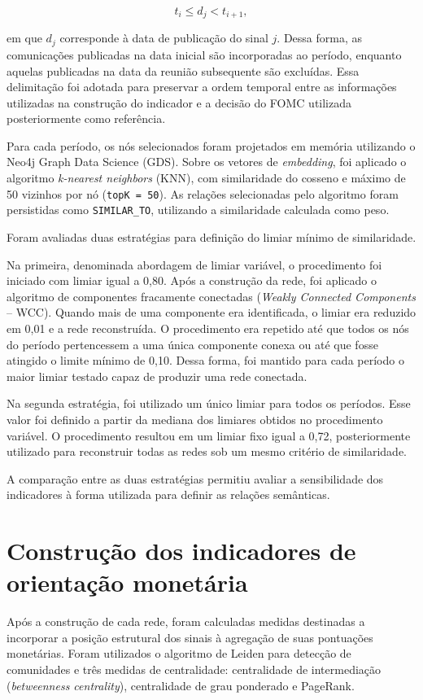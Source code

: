 \[
t_i \leq d_j < t_{i+1},
\]

em que $d_j$ corresponde à data de publicação do sinal $j$. Dessa forma, as
comunicações publicadas na data inicial são incorporadas ao período, enquanto
aquelas publicadas na data da reunião subsequente são excluídas. Essa
delimitação foi adotada para preservar a ordem temporal entre as informações
utilizadas na construção do indicador e a decisão do FOMC utilizada
posteriormente como referência.

Para cada período, os nós selecionados foram projetados em memória utilizando o
Neo4j Graph Data Science (GDS). Sobre os vetores de \textit{embedding}, foi
aplicado o algoritmo \textit{k-nearest neighbors} (KNN), com similaridade do
cosseno e máximo de 50 vizinhos por nó (\texttt{topK = 50}). As relações
selecionadas pelo algoritmo foram persistidas como
\texttt{SIMILAR\_TO}, utilizando a similaridade calculada como peso.

Foram avaliadas duas estratégias para definição do limiar mínimo de
similaridade.

Na primeira, denominada abordagem de limiar variável, o procedimento foi
iniciado com limiar igual a 0,80. Após a construção da rede, foi aplicado o
algoritmo de componentes fracamente conectadas (\textit{Weakly Connected
Components} -- WCC). Quando mais de uma componente era identificada, o limiar
era reduzido em 0,01 e a rede reconstruída. O procedimento era repetido até que
todos os nós do período pertencessem a uma única componente conexa ou até que
fosse atingido o limite mínimo de 0,10. Dessa forma, foi mantido para cada
período o maior limiar testado capaz de produzir uma rede conectada.

Na segunda estratégia, foi utilizado um único limiar para todos os períodos.
Esse valor foi definido a partir da mediana dos limiares obtidos no procedimento
variável. O procedimento resultou em um limiar fixo igual a 0,72, posteriormente
utilizado para reconstruir todas as redes sob um mesmo critério de similaridade.

A comparação entre as duas estratégias permitiu avaliar a sensibilidade dos
indicadores à forma utilizada para definir as relações semânticas.

\section{Construção dos indicadores de orientação monetária}

Após a construção de cada rede, foram calculadas medidas destinadas a incorporar
a posição estrutural dos sinais à agregação de suas pontuações monetárias.
Foram utilizados o algoritmo de Leiden para detecção de comunidades e três
medidas de centralidade: centralidade de intermediação
(\textit{betweenness centrality}), centralidade de grau ponderado e PageRank.

